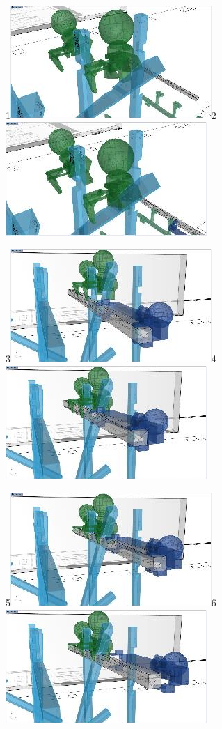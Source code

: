 \documentclass[11pt]{book}
\begin{document}
{\footnotesize 1\includegraphics[width=7.64cm,height=4.3cm]{./images/image46.jpeg}2\includegraphics[width=7.64cm,height=4.32cm]{./images/image47.jpeg}}

{\footnotesize 3\includegraphics[width=7.64cm,height=4.32cm]{./images/image48.jpeg}4\includegraphics[width=7.64cm,height=4.32cm]{./images/image49.jpeg}}

{\footnotesize 5\includegraphics[width=7.64cm,height=4.32cm]{./images/image50.jpeg}6\includegraphics[width=7.64cm,height=4.32cm]{./images/image51.jpeg}}
\end{document}
